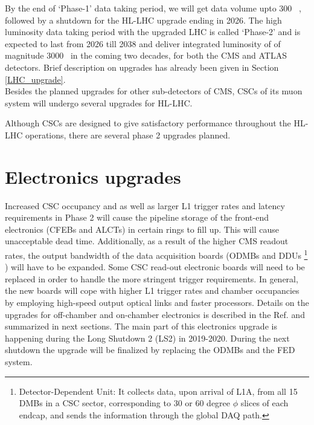 By the end of `Phase-1' data taking period, we will get data volume upto 300 ~\ifb, followed by a shutdown for the HL-LHC upgrade ending in 2026. The high luminosity data taking period with the upgraded LHC is called `Phase-2' and is expected to last from 2026 till 2038 and deliver integrated luminosity of of magnitude 3000 ~\ifb in the coming two decades, for both the CMS and ATLAS detectors. Brief description on upgrades has already been given in Section \ref{LHC_upgrade}. \\
Besides the planned upgrades for other sub-detectors of CMS, CSCs of its muon system will undergo several upgrades for HL-LHC. 


Although CSCs are designed to give satisfactory performance throughout the HL-LHC operations, there are several phase 2 upgrades planned. 
\section{Electronics upgrades} \label{electronics_upgrade}
Increased CSC occupancy and as well as larger L1 trigger rates and latency requirements in Phase 2 will cause the pipeline storage of the front-end electronics (CFEBs and ALCTs) in certain rings to fill up. This will cause unacceptable dead time. 
Additionally, as a result of the higher CMS readout rates, the output bandwidth of the data acquisition boards 
(ODMBs and DDUs \footnote{Detector-Dependent Unit: It collects data, upon arrival of L1A, from all 15 DMBs in a CSC sector, corresponding to 30 or 60 degree $\phi$ slices of each endcap, and
sends the information through the global DAQ path.} ) will have to be expanded. 
Some CSC read-out electronic boards will need to be replaced in order to handle the more stringent trigger requirements. 
In general, the new boards will cope with higher L1 trigger rates and chamber occupancies by employing high-speed output optical links and faster processors. Details on the upgrades for off-chamber and on-chamber electronics is described in the Ref. \cite{CERN-LHCC-2017-012} and summarized in next sections. The main part of this electronics upgrade is happening during the Long Shutdown 2 (LS2) in 2019-2020. During the next shutdown the upgrade will be finalized by replacing the ODMBs and the FED system.

